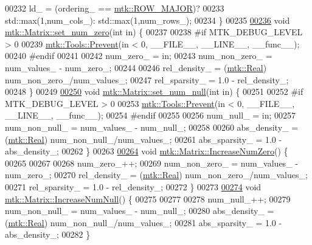 \begin{DoxyCode}
00232   ld\_ = (ordering\_ == \hyperlink{namespacemtk_ga622801bd9f912d0f976c3e383f5f581cabc55178ac16eb1ce89b5f3ab915a91f3}{mtk::ROW\_MAJOR})?
00233     std::max(1,num\_cols\_): std::max(1,num\_rows\_);
00234 \}
00235 
\hypertarget{mtk__matrix_8cc_source_l00236}{}\hyperlink{classmtk_1_1Matrix_ae529100c5c280088e9acf8e8f7994f73}{00236} \textcolor{keywordtype}{void} \hyperlink{classmtk_1_1Matrix_ae529100c5c280088e9acf8e8f7994f73}{mtk::Matrix::set\_num\_zero}(\textcolor{keywordtype}{int} in) \{
00237 
00238 \textcolor{preprocessor}{  #if MTK\_DEBUG\_LEVEL > 0}
00239   \hyperlink{classmtk_1_1Tools_afe5bb096309258e2e72503fd7b41c7e0}{mtk::Tools::Prevent}(in < 0, \_\_FILE\_\_, \_\_LINE\_\_, \_\_func\_\_);
00240 \textcolor{preprocessor}{  #endif}
00241 
00242   num\_zero\_ = in;
00243   num\_non\_zero\_ = num\_values\_ - num\_zero\_;
00244 
00246   rel\_density\_ = (\hyperlink{group__c01-roots_gac080bbbf5cbb5502c9f00405f894857d}{mtk::Real}) num\_non\_zero\_/num\_values\_;
00247   rel\_sparsity\_ = 1.0 - rel\_density\_;
00248 \}
00249 
\hypertarget{mtk__matrix_8cc_source_l00250}{}\hyperlink{classmtk_1_1Matrix_a66c2c1c127f4efefc4a407e9552e928d}{00250} \textcolor{keywordtype}{void} \hyperlink{classmtk_1_1Matrix_a66c2c1c127f4efefc4a407e9552e928d}{mtk::Matrix::set\_num\_null}(\textcolor{keywordtype}{int} in) \{
00251 
00252 \textcolor{preprocessor}{  #if MTK\_DEBUG\_LEVEL > 0}
00253   \hyperlink{classmtk_1_1Tools_afe5bb096309258e2e72503fd7b41c7e0}{mtk::Tools::Prevent}(in < 0, \_\_FILE\_\_, \_\_LINE\_\_, \_\_func\_\_);
00254 \textcolor{preprocessor}{  #endif}
00255 
00256   num\_null\_ = in;
00257   num\_non\_null\_ = num\_values\_ - num\_null\_;
00258 
00260   abs\_density\_ = (\hyperlink{group__c01-roots_gac080bbbf5cbb5502c9f00405f894857d}{mtk::Real}) num\_non\_null\_/num\_values\_;
00261   abs\_sparsity\_ = 1.0 - abs\_density\_;
00262 \}
00263 
\hypertarget{mtk__matrix_8cc_source_l00264}{}\hyperlink{classmtk_1_1Matrix_a2e7c4b84d0cbf9b0122b5dc906ad1eae}{00264} \textcolor{keywordtype}{void} \hyperlink{classmtk_1_1Matrix_a2e7c4b84d0cbf9b0122b5dc906ad1eae}{mtk::Matrix::IncreaseNumZero}() \{
00265 
00267 
00268   num\_zero\_++;
00269   num\_non\_zero\_ = num\_values\_ - num\_zero\_;
00270   rel\_density\_ = (\hyperlink{group__c01-roots_gac080bbbf5cbb5502c9f00405f894857d}{mtk::Real}) num\_non\_zero\_/num\_values\_;
00271   rel\_sparsity\_ = 1.0 - rel\_density\_;
00272 \}
00273 
\hypertarget{mtk__matrix_8cc_source_l00274}{}\hyperlink{classmtk_1_1Matrix_ac96dd5f31ebcd4388352577487cd6f11}{00274} \textcolor{keywordtype}{void} \hyperlink{classmtk_1_1Matrix_ac96dd5f31ebcd4388352577487cd6f11}{mtk::Matrix::IncreaseNumNull}() \{
00275 
00277 
00278   num\_null\_++;
00279   num\_non\_null\_ = num\_values\_ - num\_null\_;
00280   abs\_density\_ = (\hyperlink{group__c01-roots_gac080bbbf5cbb5502c9f00405f894857d}{mtk::Real}) num\_non\_null\_/num\_values\_;
00281   abs\_sparsity\_ = 1.0 - abs\_density\_;
00282 \}
\end{DoxyCode}
